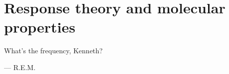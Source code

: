 \chapter{Response theory and molecular properties}\label{ch:molprop}
\epigraph{What's the frequency, Kenneth?}{--- \textsc{R.E.M.}}

